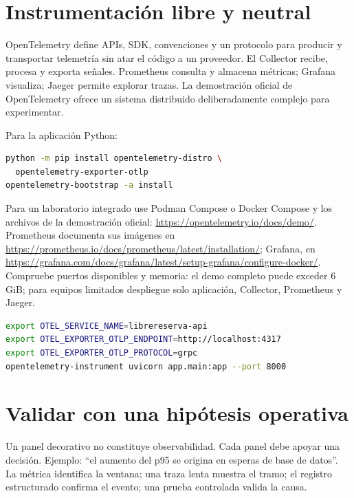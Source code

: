 \section{Instrumentación libre y neutral}

OpenTelemetry define APIs, SDK, convenciones y un protocolo para producir y transportar telemetría sin atar el código a un proveedor. El Collector recibe, procesa y exporta señales. Prometheus consulta y almacena métricas; Grafana visualiza; Jaeger permite explorar trazas. La demostración oficial de OpenTelemetry ofrece un sistema distribuido deliberadamente complejo para experimentar.

\begin{instalacion}
Para la aplicación Python:
\begin{lstlisting}[language=bash]
python -m pip install opentelemetry-distro \
  opentelemetry-exporter-otlp
opentelemetry-bootstrap -a install
\end{lstlisting}
Para un laboratorio integrado use Podman Compose o Docker Compose y los archivos de la demostración oficial: \url{https://opentelemetry.io/docs/demo/}. Prometheus documenta sus imágenes en \url{https://prometheus.io/docs/prometheus/latest/installation/}; Grafana, en \url{https://grafana.com/docs/grafana/latest/setup-grafana/configure-docker/}. Compruebe puertos disponibles y memoria: el demo completo puede exceder 6 GiB; para equipos limitados despliegue solo aplicación, Collector, Prometheus y Jaeger.
\end{instalacion}

\begin{lstlisting}[language=bash,caption={Ejecución de FastAPI con instrumentación automática.}]
export OTEL_SERVICE_NAME=librereserva-api
export OTEL_EXPORTER_OTLP_ENDPOINT=http://localhost:4317
export OTEL_EXPORTER_OTLP_PROTOCOL=grpc
opentelemetry-instrument uvicorn app.main:app --port 8000
\end{lstlisting}

\section{Validar con una hipótesis operativa}

Un panel decorativo no constituye observabilidad. Cada panel debe apoyar una decisión. Ejemplo: ``el aumento del p95 se origina en esperas de base de datos''. La métrica identifica la ventana; una traza lenta muestra el tramo; el registro estructurado confirma el evento; una prueba controlada valida la causa.

